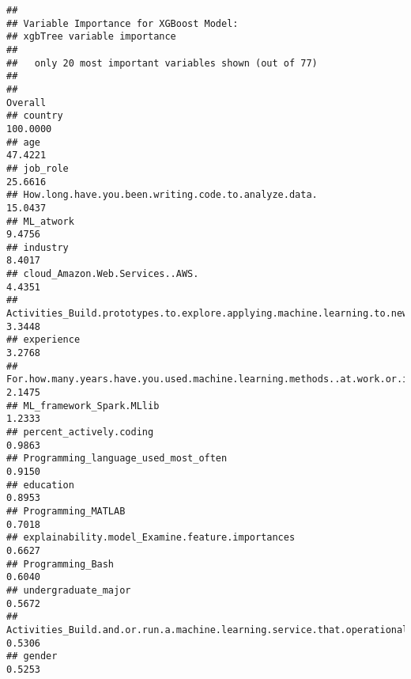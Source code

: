 \documentclass[
]{article}
\begin{document}
\begin{verbatim}
## 
## Variable Importance for XGBoost Model:
## xgbTree variable importance
## 
##   only 20 most important variables shown (out of 77)
## 
##                                                                                                             Overall
## country                                                                                                    100.0000
## age                                                                                                         47.4221
## job_role                                                                                                    25.6616
## How.long.have.you.been.writing.code.to.analyze.data.                                                        15.0437
## ML_atwork                                                                                                    9.4756
## industry                                                                                                     8.4017
## cloud_Amazon.Web.Services..AWS.                                                                              4.4351
## Activities_Build.prototypes.to.explore.applying.machine.learning.to.new.areas                                3.3448
## experience                                                                                                   3.2768
## For.how.many.years.have.you.used.machine.learning.methods..at.work.or.in.school..                            2.1475
## ML_framework_Spark.MLlib                                                                                     1.2333
## percent_actively.coding                                                                                      0.9863
## Programming_language_used_most_often                                                                         0.9150
## education                                                                                                    0.8953
## Programming_MATLAB                                                                                           0.7018
## explainability.model_Examine.feature.importances                                                             0.6627
## Programming_Bash                                                                                             0.6040
## undergraduate_major                                                                                          0.5672
## Activities_Build.and.or.run.a.machine.learning.service.that.operationally.improves.my.product.or.workflows   0.5306
## gender                                                                                                       0.5253

\end{verbatim}
\end{document}
